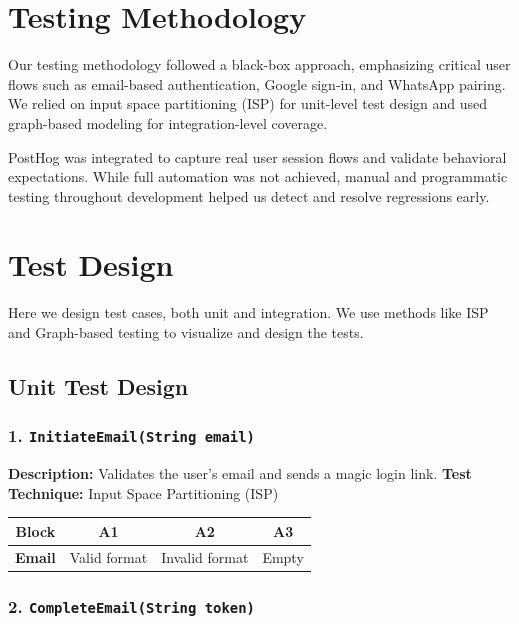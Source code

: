 \section{Testing Methodology}

Our testing methodology followed a black-box approach, emphasizing critical user flows such as email-based authentication, Google sign-in, and WhatsApp pairing. We relied on input space partitioning (ISP) for unit-level test design and used graph-based modeling for integration-level coverage.

PostHog was integrated to capture real user session flows and validate behavioral expectations. While full automation was not achieved, manual and programmatic testing throughout development helped us detect and resolve regressions early.

\section{Test Design}

Here we design test cases, both unit and integration. We use methods like ISP and Graph-based testing to visualize and design the tests.

\subsection{Unit Test Design}

\subsubsection*{1. \texttt{InitiateEmail(String email)}}

\textbf{Description:} Validates the user’s email and sends a magic login link.  
\textbf{Test Technique:} Input Space Partitioning (ISP)

\begin{table}[h!]
\centering
\begin{tabular}{|c|c|c|c|}
\hline
\textbf{Block} & \textbf{A1} & \textbf{A2} & \textbf{A3} \\
\hline
\textbf{Email} & Valid format & Invalid format & Empty \\
\hline
\end{tabular}
\end{table}

\subsubsection*{2. \texttt{CompleteEmail(String token)}}

